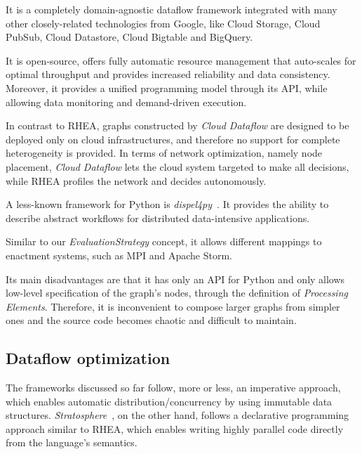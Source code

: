 \documentclass[sigplan,review,anonymous,screen]{acmart}
\begin{document}
It is a completely domain-agnostic dataflow framework integrated with many other
closely-related technologies from Google, like Cloud Storage, Cloud PubSub,
Cloud Datastore, Cloud Bigtable and BigQuery.

It is open-source, offers fully automatic resource management that auto-scales
for optimal throughput and provides increased reliability and data consistency.
Moreover, it provides a unified programming model through its API, while
allowing data monitoring and demand-driven execution.

In contrast to \textsc{RHEA}, graphs constructed by \textit{Cloud Dataflow} are
designed to be deployed only on cloud infrastructures, and therefore no support
for complete heterogeneity is provided. In terms of network optimization, namely
node placement,  \textit{Cloud Dataflow} lets the cloud system targeted to make
all decisions, while \textsc{RHEA} profiles the network and decides
autonomously.

A less-known framework for Python is
\textit{dispel4py}~\cite{dispel4py}. It provides the ability
to describe abstract workflows for distributed data-intensive applications.

Similar to our \textit{EvaluationStrategy} concept, it allows different mappings
to enactment systems, such as MPI and Apache Storm.

Its main disadvantages are that it has only an API for Python and only allows
low-level specification of the graph's nodes, through the definition of
\textit{Processing Elements}. Therefore, it is inconvenient to compose larger
graphs from simpler ones and the source code becomes chaotic and difficult to
maintain.

\subsection{Dataflow optimization}
The frameworks discussed so far follow, more or less, an imperative approach,
which enables automatic distribution/concurrency by using immutable data
structures. \textit{Stratosphere}~\cite{stratosphere}, on the other hand, follows
a declarative programming approach similar to \textsc{RHEA}, which enables
writing highly parallel code directly from the language's semantics.
\end{document}
